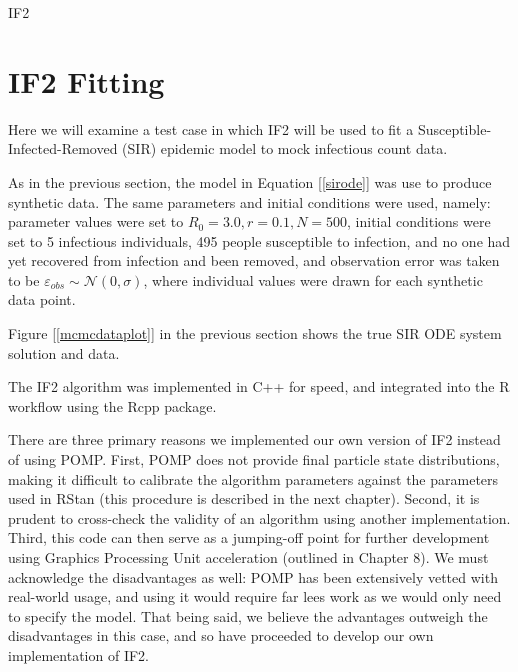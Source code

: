 \begin{algorithm}
{{	        }

	        \BlankLine


	    }

        \BlankLine


        \BlankLine

        \caption{IF2 \label{if2}}

    \end{algorithm}


\section{IF2 Fitting}

    Here we will examine a test case in which IF2 will be used to fit a Susceptible-Infected-Removed (SIR) epidemic model to mock infectious count data.

    As in the previous section, the model in Equation [\ref{sirode}] was use to produce synthetic data. The same parameters and initial conditions were used, namely: parameter values were set to $R_0 = 3.0, r = 0.1, N = 500$, initial conditions were set to 5 infectious individuals, 495 people susceptible to infection, and no one had yet recovered from infection and been removed, and observation error was taken to be $\varepsilon_{obs} \sim \mathcal{N}(0,\sigma)$, where individual values were drawn for each synthetic data point.

    Figure [\ref{mcmcdataplot}] in the previous section shows the true SIR ODE system solution and data.

    The IF2 algorithm was implemented in C++ for speed, and integrated into the R workflow using the Rcpp package.

    There are three primary reasons we implemented our own version of IF2 instead of using POMP. First, POMP does not provide final particle state distributions, making it difficult to calibrate the algorithm parameters against the parameters used in RStan (this procedure is described in the next chapter). Second, it is prudent to cross-check the validity of an algorithm using another implementation. Third, this code can then serve as a jumping-off point for further development using Graphics Processing Unit acceleration (outlined in Chapter 8). We must acknowledge the disadvantages as well: POMP has been extensively vetted with real-world usage, and using it would require far lees work as we would only need to specify the model. That being said, we believe the advantages outweigh the disadvantages in this case, and so have proceeded to develop our own implementation of IF2.
	
